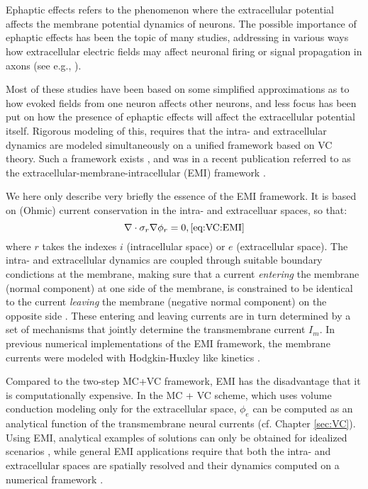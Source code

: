 \section{ }
\label{sec:VC:EMI}
Ephaptic effects refers to the phenomenon where the extracellular potential affects the membrane potential dynamics of neurons. The possible importance of ephaptic effects has been the topic of many studies, addressing in various ways how extracellular electric fields may affect neuronal firing or signal propagation in axons (see e.g., \cite{clark1970,Rall1977,Holt1999,Bokil2001,anastassiou2010,anastassiou2015,Goldwyn2016,capllonch2020,ruffini2020}). 

Most of these studies have been based on some simplified approximations as to how evoked fields from one neuron affects other neurons, and less focus has been put on how the presence of ephaptic effects will affect the extracellular potential itself. Rigorous modeling of this, requires that the intra- and extracellular dynamics are modeled simultaneously on a unified framework based on VC theory. Such a framework exists \cite{Krassowska1994,Agudelo-Toro2013,Tveito 2017}, and was in a recent publication referred to as the extracellular-membrane-intracellular (EMI) framework \cite{Tveito2017}. 

We here only describe very briefly the essence of the EMI framework. It is based on (Ohmic) current conservation in the intra- and extracelluar spaces, so that:
\begin{equation}
\nabla \cdot \sigma_r \nabla \phi_r = 0,
\ref{eq:VC:EMI}
\end{equation}
where $r$ takes the indexes $i$ (intracellular space) or $e$ (extracellular space). The intra- and extracellular dynamics are coupled through suitable boundary condictions at the membrane, making sure that a current \textit{entering} the membrane (normal component) at one side of the membrane, is constrained to be identical to the current \textit{leaving} the membrane (negative normal component) on the opposite side \cite{Krassowska1994}. These entering and leaving currents are in turn determined by a set of mechanisms that jointly determine the transmembrane current $I_m$. In previous numerical implementations of the EMI framework, the membrane currents were modeled with Hodgkin-Huxley like kinetics \cite{Agudelo-Toro2013,Tveito2017}. 

Compared to the two-step MC+VC framework, EMI has the disadvantage that it is computationally expensive. In the MC + VC scheme, which uses volume conduction modeling only for the extracellular space, $\phi_e$ can be computed as an analytical function of the transmembrane neural currents (cf. Chapter \ref{sec:VC}). Using EMI, analytical examples of solutions can only be obtained for idealized scenarios \cite{Krassowska1994}, while general EMI applications require that both the intra- and extracellular spaces are spatially resolved and their dynamics computed on a numerical framework \cite{Agudelo-Toro2013,Tveito2017}. 

